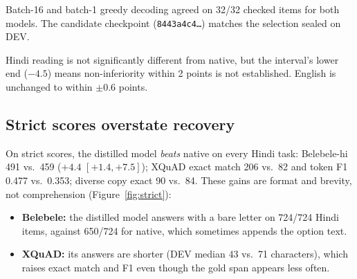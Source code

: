 \documentclass[11pt]{article}
\begin{document}
Batch-16 and batch-1 greedy decoding agreed on 32/32 checked items for both models. The candidate checkpoint (\texttt{8443a4c4\ldots}) matches the selection sealed on DEV.

Hindi reading is not significantly different from native, but the interval's lower end ($-4.5$) means non-inferiority within 2 points is not established. English is unchanged to within $\pm0.6$ points.

\subsection{Strict scores overstate recovery}
\label{sec:strict}

On strict scores, the distilled model \emph{beats} native on every Hindi task: Belebele-hi 491 vs.\ 459 ($+4.4$ $[+1.4, +7.5]$); XQuAD exact match 206 vs.\ 82 and token F1 0.477 vs.\ 0.353; diverse copy exact 90 vs.\ 84. These gains are format and brevity, not comprehension (Figure~\ref{fig:strict}):
\begin{itemize}
  \item \textbf{Belebele:} the distilled model answers with a bare letter on 724/724 Hindi items, against 650/724 for native, which sometimes appends the option text.
  \item \textbf{XQuAD:} its answers are shorter (DEV median 43 vs.\ 71 characters), which raises exact match and F1 even though the gold span appears less often.
\end{itemize}
\end{document}
